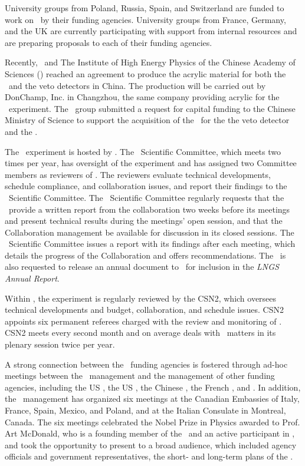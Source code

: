University groups from Poland, Russia, Spain, and Switzerland are funded to work on \DSks\ by their funding agencies.  University groups from France, Germany, and the UK are currently participating with support from internal resources and are preparing proposals to each of their funding agencies.

Recently, \INFN\ and The Institute of High Energy Physics of the Chinese Academy of Sciences (\IHEP) reached an agreement to produce the acrylic material for both the \TPC\ and the veto detectors in China.  The production will be carried out by DonChamp, Inc. in Changzhou, the same company providing acrylic for the \JUNO\ experiment.  The \IHEP\ group submitted a request for capital funding to the Chinese Ministry of Science to support the acquisition of the \PMMA\ for the the veto detector and the \LArTPC.

The \DSks\ experiment is hosted by \LNGS.  The \LNGS\ Scientific Committee, which meets two times per year, has oversight of the experiment and has assigned two Committee members as reviewers of \DSks.  The reviewers evaluate technical developments, schedule compliance, and collaboration issues, and report their findings to the \LNGS\ Scientific Committee.  The \LNGS\ Scientific Committee regularly requests that the \GADMC\ provide a written report from the collaboration two weeks before its meetings and present technical results during the meetings' open session, and that the Collaboration management be available for discussion in its closed sessions.  The \LNGS\ Scientific Committee issues a report with its findings after each meeting, which details the progress of the Collaboration and offers recommendations.  The \GADMC\ is also requested to release an annual document to \LNGS\ for inclusion in the {\em LNGS Annual Report}.

Within \INFN, the experiment is regularly reviewed by the CSN2, which oversees technical developments and budget, collaboration, and schedule issues.  CSN2 appoints six permanent referees charged with the review and monitoring of \DSks.  CSN2 meets every second month and on average deals with \DSks\ matters in its plenary session twice per year.  

A strong connection between the \DSks\ funding agencies is fostered through ad-hoc meetings between the \INFN\ management and the management of other funding agencies, including the US \NSF, the US \DOE, the Chinese \IHEP, the French \INDPT, and \CERN. In addition, the \DSk\ management has organized six meetings at the Canadian Embassies of Italy, France, Spain, Mexico, and Poland, and at the Italian Consulate in Montreal, Canada.  The six meetings celebrated the Nobel Prize in Physics awarded to Prof. Art McDonald, who is a founding member of the \GADMC\ and an active participant in \DSks, and took the opportunity to present to a broad audience, which included agency officials and government representatives, the short- and long-term plans of the \GADMC.


